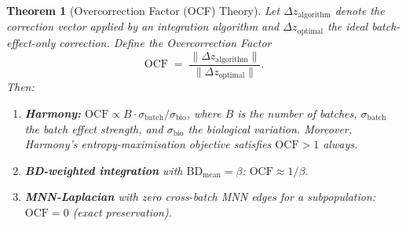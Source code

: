 \documentclass[11pt]{article}
\newtheorem{theorem}{Theorem}
\begin{document}
\begin{theorem}[Overcorrection Factor (OCF) Theory]
\label{thm:ocf}
Let $\Delta z_{\mathrm{algorithm}}$ denote the correction vector applied by
an integration algorithm and $\Delta z_{\mathrm{optimal}}$ the ideal
batch-effect-only correction.  Define the \emph{Overcorrection Factor}
\[
    \mathrm{OCF}
    \;=\; \frac{\|\Delta z_{\mathrm{algorithm}}\|}
               {\|\Delta z_{\mathrm{optimal}}\|}.
\]
Then:
\begin{enumerate}
\item[\textup{(a)}] \textbf{Harmony:}
$\mathrm{OCF} \propto B \cdot \sigma_{\mathrm{batch}} / \sigma_{\mathrm{bio}}$,
where $B$ is the number of batches, $\sigma_{\mathrm{batch}}$ the batch
effect strength, and $\sigma_{\mathrm{bio}}$ the biological variation.
Moreover, Harmony's entropy-maximisation objective satisfies
$\mathrm{OCF} > 1$ always.

\item[\textup{(b)}] \textbf{BD-weighted integration} with
$\mathrm{BD}_{\mathrm{mean}} = \beta$:
$\mathrm{OCF} \approx 1/\beta$.

\item[\textup{(c)}] \textbf{MNN-Laplacian} with zero cross-batch MNN edges
for a subpopulation: $\mathrm{OCF} = 0$ (exact preservation).
\end{enumerate}
\end{theorem}
\end{document}
